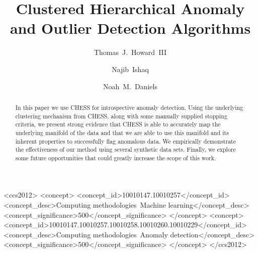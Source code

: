 \documentclass[sigconf]{acmart}
\begin{document}
\title{Clustered Hierarchical Anomaly and Outlier Detection Algorithms}

\author{Thomas~J.~Howard~III}

\author{Najib~Ishaq}
\authornotemark[1]

\author{Noah~M.~Daniels}

\renewcommand{\shortauthors}{Howard and Ishaq, et al.}

\begin{abstract}
In this paper we use CHESS for introspective anomaly detection.
Using the underlying clustering mechanism from CHESS, along with some manually supplied stopping criteria, we present strong evidence that CHESS is able to accurately map the underlying manifold of the data and that we are able to use this manifold and its inherent properties to successfully flag anomalous data.
We empirically demonstrate the effectiveness of our method using several synthetic data sets.
Finally, we explore some future opportunities that could greatly increase the scope of this work.
\end{abstract}

\begin{CCSXML}
<ccs2012>
   <concept>
       <concept_id>10010147.10010257</concept_id>
       <concept_desc>Computing methodologies~Machine learning</concept_desc>
       <concept_significance>500</concept_significance>
       </concept>
   <concept>
       <concept_id>10010147.10010257.10010258.10010260.10010229</concept_id>
       <concept_desc>Computing methodologies~Anomaly detection</concept_desc>
       <concept_significance>500</concept_significance>
       </concept>
 </ccs2012>
\end{CCSXML}



\maketitle









\end{document}
